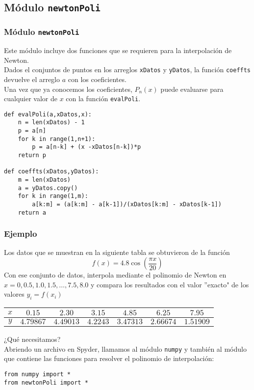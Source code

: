 \subsection{Módulo \texttt{newtonPoli}}
\begin{frame}
\frametitle{Módulo \texttt{newtonPoli}}
Este módulo incluye dos funciones que se requieren para la interpolación de Newton.
\\
\medskip
Dados el conjuntos de puntos en los arreglos \texttt{xDatos} y \texttt{yDatos}, la función \texttt{coeffts} devuelve el arreglo $a$ con los coeficientes.
\\
\medskip
Una vez que ya conocemos los coeficientes, $P_{n}(x)$ puede evaluarse para cualquier valor de $x$ con la función \texttt{evalPoli}.
\end{frame}
\begin{frame}[fragile]
\begin{lstlisting}
def evalPoli(a,xDatos,x):
    n = len(xDatos) - 1 
    p = a[n]
    for k in range(1,n+1):
        p = a[n-k] + (x -xDatos[n-k])*p
    return p
    
def coeffts(xDatos,yDatos):
    m = len(xDatos) 
    a = yDatos.copy()
    for k in range(1,m):
        a[k:m] = (a[k:m] - a[k-1])/(xDatos[k:m] - xDatos[k-1])
    return a
\end{lstlisting}
\end{frame}
\begin{frame}
\frametitle{Ejemplo}
Los datos que se muestran en la siguiente tabla se obtuvieron de la función
\[ f(x) = 4.8 \cos \left( \dfrac{\pi x}{20} \right)\]
Con ese conjunto de datos, interpola mediante el polinomio de Newton en $x=0, 0.5, 1.0, 1.5, \ldots,7.5, 8.0$ y compara los resultados con el valor ''exacto" de los valores $y_{i} = f(x_{i})$
\begin{table}[htbp]
\centering \small
\begin{tabulary}{15cm}{c | c | c | c | c | c | c}
$x$ & $0.15$ & $2.30$ & $3.15$ & $4.85$ & $6.25$ & $7.95$ \\
\midrule $y$ & $4.79867$ & $4.49013$ & $4.2243$ & $3.47313$ & $2.66674$ & $1.51909$
\end{tabulary}
\end{table}
\end{frame}
\begin{frame}[fragile]
¿Qué necesitamos?
\\
\bigskip
Abriendo un archivo en Spyder, llamamos al módulo \texttt{numpy} y también al módulo que contiene las funciones para resolver el polinomio de interpolación:
\begin{lstlisting}
from numpy import *
from newtonPoli import *
\end{lstlisting}
\end{frame}
